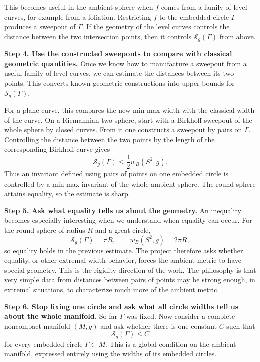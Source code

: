 This becomes useful in the ambient sphere
when $f$ comes from a family of level curves,
for example from a foliation. Restricting
$f$ to the embedded circle $\Gamma$ produces
a sweepout of $\Gamma$. If the geometry of
the level curves controls the distance
between the two intersection points, then it
controls $\mathcal{S}_g(\Gamma)$ from above.

\medskip\noindent
{\bf Step 4. Use the constructed sweepouts to
compare with classical geometric quantities.}
Once we know how to manufacture a sweepout
from a useful family of level curves, we can
estimate the distances between its two
points. This converts known geometric
constructions into upper bounds for
$\mathcal{S}_g(\Gamma)$.

For a plane curve, this compares the new
min-max width with the classical width of
the curve. On a Riemannian two-sphere, start
with a Birkhoff sweepout of the whole sphere
by closed curves. From it one constructs a
sweepout by pairs on $\Gamma$. Controlling
the distance between the two points by the
length of the corresponding Birkhoff curve
gives
$$
\mathcal{S}_g(\Gamma)
\leq
\frac{1}{2}w_B(S^2,g).
$$
Thus an invariant defined using pairs of
points on one embedded circle is controlled
by a min-max invariant of the whole ambient
sphere. The round sphere attains equality,
so the estimate is sharp.

\medskip\noindent
{\bf Step 5. Ask what equality tells us
about the geometry.}
An inequality becomes especially interesting
when we understand when equality can occur.
For the round sphere of radius $R$ and a
great circle,
$$
\mathcal{S}_g(\Gamma)=\pi R,
\qquad
w_B(S^2,g)=2\pi R,
$$
so equality holds in the previous estimate.
The project therefore asks whether equality,
or other extremal width behavior, forces the
ambient metric to have special geometry.
This is the rigidity direction of the work.
The philosophy is that very simple data from
distances between pairs of points may be
strong enough, in extremal situations, to
characterize much more of the ambient
metric.

\medskip\noindent
{\bf Step 6. Stop fixing one circle and ask
what all circle widths tell us about the
whole manifold.}
So far $\Gamma$ was fixed. Now consider a
complete noncompact manifold $(M,g)$ and ask
whether there is one constant $C$ such that
$$
\mathcal{S}_g(\Gamma)\leq C
$$
for every embedded circle $\Gamma\subset M$.
This is a global condition on the ambient
manifold, expressed entirely using the
widths of its embedded circles.

